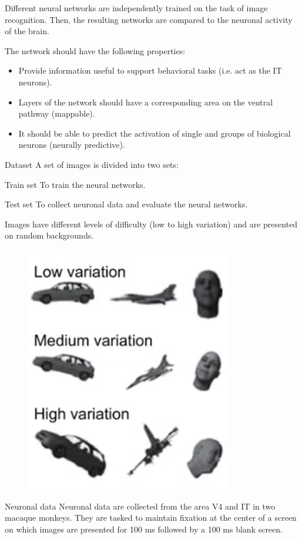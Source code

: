 \begin{casestudy}
    Different neural networks are independently trained on the task of image recognition.
    Then, the resulting networks are compared to the neuronal activity of the brain.

    The network should have the following properties:
    \begin{itemize}
        \item Provide information useful to support behavioral tasks (i.e. act as the IT neurons).
        \item Layers of the network should have a corresponding area on the ventral pathway (mappable).
        \item It should be able to predict the activation of single and groups of biological neurons (neurally predictive).
    \end{itemize}

    \begin{descriptionlist}
        \item[Dataset] 
            A set of images is divided into two sets:
            \begin{descriptionlist}
                \item[Train set] To train the neural networks.
                \item[Test set] To collect neuronal data and evaluate the neural networks.
            \end{descriptionlist}

            Images have different levels of difficulty (low to high variation) and are presented on random backgrounds.
            \begin{figure}[H]
                \centering
                \includegraphics[width=0.2\linewidth]{./img/vision_nn_difficulty.png}
            \end{figure}


        \item[Neuronal data]
            Neuronal data are collected from the area V4 and IT in two macaque monkeys.
            They are tasked to maintain fixation at the center of a screen on which images are presented for 100 ms followed by a 100 ms blank screen.


\end{descriptionlist}
\end{casestudy}
